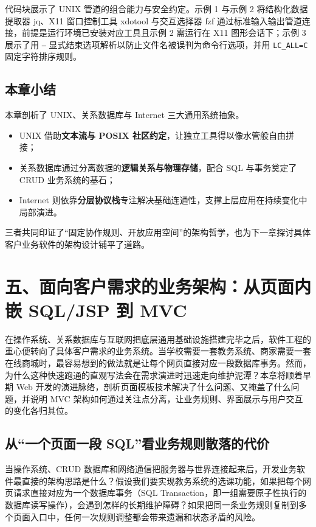 \documentclass[UTF8,a4paper,11pt,fontset=fandol]{ctexart}
\begin{document}
代码块展示了 UNIX 管道的组合能力与安全约定。示例 1 与示例 2 将结构化数据提取器 jq、X11 窗口控制工具 xdotool 与交互选择器 fzf 通过标准输入输出管道连接，前提是运行环境已安装对应工具且示例 2 需运行在 X11 图形会话下；示例 3 展示了用 \texttt{--} 显式结束选项解析以防止文件名被误判为命令行选项，并用 \texttt{LC\_ALL=C} 固定字符排序规则。

\subsection{本章小结}

本章剖析了 UNIX、关系数据库与 Internet 三大通用系统抽象。

\begin{itemize}
\item UNIX 借助\textbf{文本流与 POSIX 社区约定}，让独立工具得以像水管般自由拼接；

\item 关系数据库通过分离数据的\textbf{逻辑关系与物理存储}，配合 SQL 与事务奠定了 CRUD 业务系统的基石；

\item Internet 则依靠\textbf{分层协议栈}专注解决基础连通性，支撑上层应用在持续变化中局部演进。

\end{itemize}
三者共同印证了“固定协作规则、开放应用空间”的架构哲学，也为下一章探讨具体客户业务软件的架构设计铺平了道路。

\section{五、面向客户需求的业务架构：从页面内嵌 SQL/JSP 到 MVC}

在操作系统、关系数据库与互联网把底层通用基础设施搭建完毕之后，软件工程的重心便转向了具体客户需求的业务系统。当学校需要一套教务系统、商家需要一套在线商城时，最容易想到的做法就是让每个网页直接对应一段数据库事务。然而，为什么这种快速跑通的直观写法会在需求演进时迅速走向维护泥潭？本章将顺着早期 Web 开发的演进脉络，剖析页面模板技术解决了什么问题、又掩盖了什么问题，并说明 MVC 架构如何通过关注点分离，让业务规则、界面展示与用户交互的变化各归其位。

\subsection{从“一个页面一段 SQL”看业务规则散落的代价}

当操作系统、CRUD 数据库和网络通信把服务器与世界连接起来后，开发业务软件最直接的架构思路是什么？假设我们要实现教务系统的选课功能，如果把每个网页请求直接对应为一个数据库事务（SQL Transaction，即一组需要原子性执行的数据库读写操作），会遇到怎样的长期维护障碍？如果把同一条业务规则复制到多个页面入口中，任何一次规则调整都会带来遗漏和状态矛盾的风险。
\end{document}
